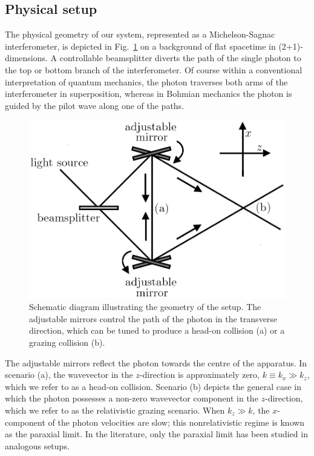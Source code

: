 \documentclass[
prx
,twocolumn
,nofootinbib
,floatfix
,superscriptaddress
]{revtex4-2}
\begin{document}
\subsection{Physical setup}
The physical geometry of our system, represented as a Michelson-Sagnac interferometer, is depicted in Fig.\ \ref{fig:setup} on a background of flat spacetime in (2+1)-dimensions. A controllable beamsplitter diverts the path of the single photon to the top or bottom branch of the interferometer. Of course within a conventional interpretation of quantum mechanics, the photon traverses both arms of the interferometer in superposition, whereas in Bohmian mechanics the photon is guided by the pilot wave along one of the paths. 
\begin{figure}[ht]
    \centering
    \includegraphics[width=\linewidth]{Fig1schematic.png}
    \caption{Schematic diagram illustrating the geometry of the setup. The adjustable mirrors control the path of the photon in the transverse direction, which can be tuned to produce a head-on collision (a) or a grazing collision (b).}
    \label{fig:setup}
\end{figure}
The adjustable mirrors reflect the photon towards the centre of the apparatus. In scenario (a), the wavevector in the $z$-direction is approximately zero, $k \equiv k_x \gg k_z$, which we refer to as a head-on collision. Scenario (b) depicts the general case in which the photon possesses a non-zero wavevector component in the $z$-direction, which we refer to as the relativistic grazing scenario. When $k_z \gg k$, the $x$-component of the photon velocities are slow; this nonrelativistic regime is known as the paraxial limit. In the literature, only the paraxial limit has been studied in analogous setups.
\end{document}
